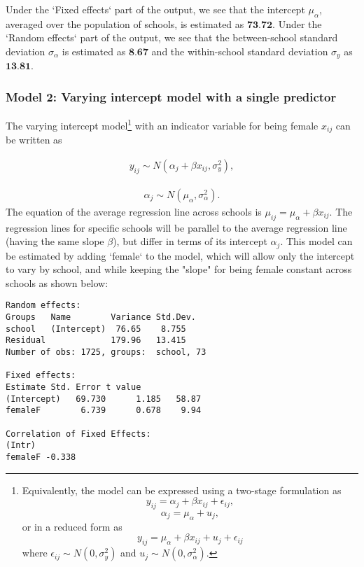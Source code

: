 Under the `Fixed effects` part of the output, we see that the intercept $\mu_{\alpha}$, averaged over the population of schools, is estimated as $\textbf{73.72}$. Under the `Random effects` part of the output, we see that the between-school standard deviation $\sigma_{\alpha}$ is estimated as $\textbf{8.67}$ and the within-school standard deviation $\sigma_{y}$ as $\textbf{13.81}$. 

\subsubsection*{Model 2: Varying intercept model with a single predictor}
The varying intercept model\footnote{Equivalently, the model can be expressed using a two-stage formulation as $$y_{ij} = \alpha_j + \beta x_{ij} +\epsilon_{ij},$$ $$\alpha_j = \mu_\alpha + u_j,$$ or in a reduced form as $$y_{ij} = \mu_\alpha + \beta x_{ij} + u_j + \epsilon_{ij}$$ where $\epsilon_{ij} \sim N(0, \sigma_{y}^{2})$ and $u_{j}\sim N(0, \sigma_{\alpha}^{2})$.} with an indicator variable for being female $x_{ij}$ can be written as

\begin{align}
y_{ij} \sim N(\alpha_{j}+\beta x_{ij} , \sigma_{y}^{2}),
\end{align}

\begin{align}
\alpha_{j}\sim N(\mu_{\alpha}, \sigma_{\alpha}^{2}).
\end{align}
The equation of the average regression line across schools is $\mu_{ij}=\mu_{\alpha}+\beta x_{ij}$. The regression lines for specific schools will be parallel to the average regression line (having the same slope $\beta$), but differ in terms of its intercept $\alpha_{j}$. This model can be estimated by adding `female` to the model, which will allow only the intercept to vary by school, and while keeping the "slope" for being female constant across schools as shown below:


\begin{Verbatim}[frame=single]
Random effects:
Groups   Name        Variance Std.Dev.
school   (Intercept)  76.65    8.755  
Residual             179.96   13.415  
Number of obs: 1725, groups:  school, 73

Fixed effects:
Estimate Std. Error t value
(Intercept)   69.730      1.185   58.87
femaleF        6.739      0.678    9.94

Correlation of Fixed Effects:
(Intr)
femaleF -0.338

\end{Verbatim}

